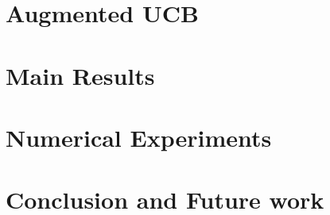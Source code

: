 \documentclass{article}
\begin{document}
%


\section{Augmented UCB}
\label{algorithm}


\section{Main Results}
\label{results}



\section{Numerical Experiments}
\label{expt}



\section{Conclusion and Future work}
\label{conclusion}



\clearpage
\newpage



%
\end{document}
